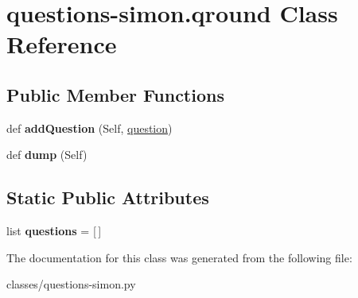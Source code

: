 \hypertarget{classquestions-simon_1_1qround}{}\section{questions-\/simon.qround Class Reference}
\label{classquestions-simon_1_1qround}
\subsection*{Public Member Functions}
\begin{DoxyCompactItemize}
\item 
\mbox{\label{classquestions-simon_1_1qround_a47efe77bf526cb5367f784dfc7c77d60}} 
def {\bfseries add\+Question} (Self, \mbox{\hyperlink{classquestions-simon_1_1question}{question}})
\item 
\mbox{\label{classquestions-simon_1_1qround_af59b9832be8715c62c25a51987767eb6}} 
def {\bfseries dump} (Self)
\end{DoxyCompactItemize}
\subsection*{Static Public Attributes}
\begin{DoxyCompactItemize}
\item 
\mbox{\label{classquestions-simon_1_1qround_af36752e2648863329a600dea111547ad}} 
list {\bfseries questions} = \mbox{[}$\,$\mbox{]}
\end{DoxyCompactItemize}


The documentation for this class was generated from the following file\+:\begin{DoxyCompactItemize}
\item 
classes/questions-\/simon.\+py\end{DoxyCompactItemize}
